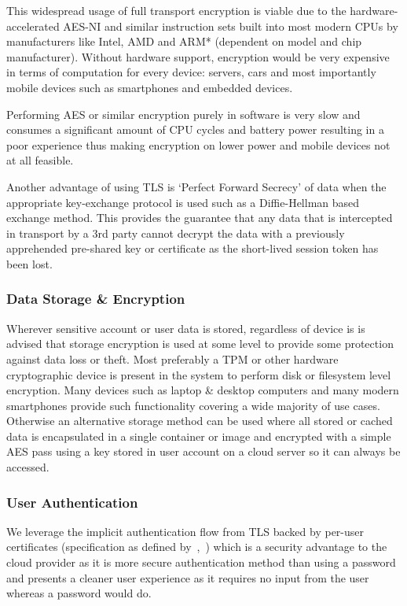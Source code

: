 \documentclass{article}
\begin{document}
This widespread usage of full transport encryption is viable due to the hardware-accelerated AES-NI and similar instruction sets built into most modern CPUs by manufacturers like Intel, AMD and ARM* (dependent on model and chip manufacturer). Without hardware support, encryption would be very expensive in terms of computation for every device: servers, cars and most importantly mobile devices such as smartphones and embedded devices.

Performing AES or similar encryption purely in software is very slow and consumes a significant amount of CPU cycles and battery power resulting in a poor experience thus making encryption on lower power and mobile devices not at all feasible.

Another advantage of using TLS is `Perfect Forward Secrecy' of data when the appropriate key-exchange protocol is used such as a Diffie-Hellman based exchange method. This provides the guarantee that any data that is intercepted in transport by a 3rd party cannot decrypt the data with a previously apprehended pre-shared key or certificate as the short-lived session token has been lost.

\subsubsection{Data Storage \& Encryption}
Wherever sensitive account or user data is stored, regardless of device is is advised that storage encryption is used at some level to provide some protection against data loss or theft. Most preferably a TPM or other hardware cryptographic device is present in the system to perform disk or filesystem level encryption. Many devices such as laptop \& desktop computers and many modern smartphones provide such functionality covering a wide majority of use cases. Otherwise an alternative storage method can be used where all stored or cached data is encapsulated in a single container or image and encrypted with a simple AES pass using a key stored in user account on a cloud server so it can always be accessed.

\subsubsection{User Authentication}
We leverage the implicit authentication flow from TLS backed by per-user certificates (specification as defined by~\textcite{rfc5246},~) which is a security advantage to the cloud provider  as it is more secure authentication method than using a password and presents a cleaner user experience as it requires no input from the user whereas a password would do.
\end{document}
